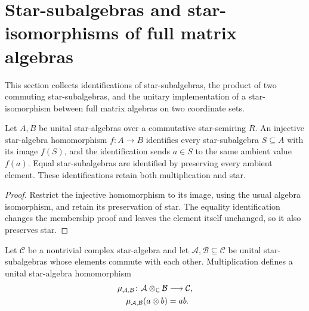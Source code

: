 \section{Star-subalgebras and star-isomorphisms of full matrix algebras}

This section collects identifications of star-subalgebras, the product of two
commuting star-subalgebras, and the unitary implementation of a
star-isomorphism between full matrix algebras on two coordinate sets.

\begin{lemma}
    \label{lem:star_subalgebra_coordinate_equivalences}
    \leanok
    Let $A,B$ be unital star-algebras over a commutative star-semiring
    $R$. An injective star-algebra homomorphism $f:A\to B$ identifies
    every star-subalgebra $S\subseteq A$ with its image $f(S)$, and the
    identification sends $a\in S$ to the same ambient value $f(a)$.
    Equal star-subalgebras are identified by preserving every ambient
    element. These identifications retain both multiplication and star.
\end{lemma}

\begin{proof}
    \leanok
    Restrict the injective homomorphism to its image, using the usual
    algebra isomorphism, and retain its preservation of star. The equality
    identification changes the membership proof and leaves the element
    itself unchanged, so it also preserves star.
\end{proof}

\begin{definition}
    \label{def:qca_commuting_factor_multiplication}
    \leanok
    Let $\mathcal C$ be a nontrivial complex star-algebra and let
    $\mathcal A,\mathcal B\subseteq\mathcal C$ be unital star-subalgebras
    whose elements commute with each other. Multiplication defines a unital
    star-algebra homomorphism
    \begin{align}
        \mu_{\mathcal A,\mathcal B}
        \colon \mathcal A\otimes_{\mathbb C}\mathcal B
         & \longrightarrow \mathcal C, \notag \\
        \mu_{\mathcal A,\mathcal B}(a\otimes b)
         & =ab.
    \end{align}
\end{definition}


